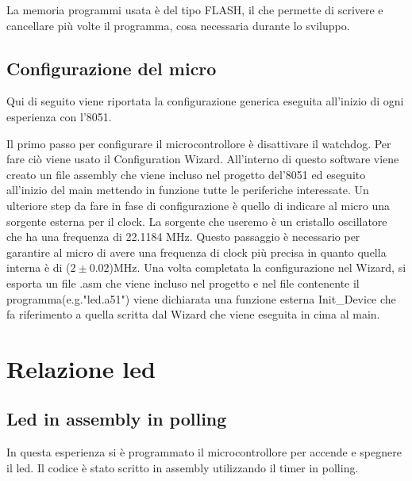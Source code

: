 \documentclass[main.tex]{subfiles}
\begin{document}
La memoria programmi usata è del tipo FLASH, il che permette di scrivere e cancellare più volte il programma, cosa necessaria durante lo sviluppo. 


\subsection{Configurazione del micro}

Qui di seguito viene riportata la configurazione generica eseguita all'inizio di ogni esperienza con l'8051.

Il primo passo per configurare il microcontrollore è disattivare il watchdog. Per fare ciò viene usato il Configuration Wizard. All'interno di questo software viene creato un file assembly che viene incluso nel progetto del'8051 ed eseguito all'inizio del main mettendo in funzione tutte le periferiche interessate. Un ulteriore step da fare in fase di configurazione è quello di indicare al micro una sorgente esterna per il clock. La sorgente che useremo è un cristallo oscillatore che ha una frequenza di 22.1184 MHz. Questo passaggio è necessario per garantire al micro di avere una frequenza di clock più precisa in quanto quella interna è di ($2\pm0.02$)MHz.
Una volta completata la configurazione nel Wizard, si esporta un file .asm che viene incluso nel progetto e nel file contenente il programma(e.g."led.a51") viene dichiarata una funzione esterna Init\_Device che fa riferimento a quella scritta dal Wizard che viene eseguita in cima al main.

\section{Relazione led}
\subsection{Led in assembly in polling}

In questa esperienza si è programmato il microcontrollore per accende e spegnere il led. Il codice è stato scritto in assembly utilizzando il timer in polling.
\end{document}
